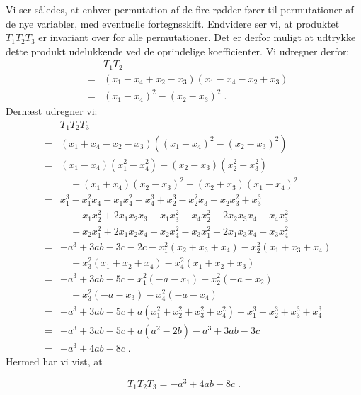 \documentclass[12pt,oneside,a4paper]{article}
\newcommand{\bas}{\begin{eqnarray*}}
\newcommand{\eas}{\end{eqnarray*}}
\begin{document}
Vi ser således, at enhver permutation af de fire rødder fører til permutationer
af de nye variabler, med eventuelle fortegnsskift. Endvidere ser vi, at
produktet $T_1 T_2 T_3$ er invariant over for alle permutationer. Det er derfor
muligt at udtrykke dette produkt udelukkende ved de oprindelige koefficienter.
Vi udregner derfor:
\bas
&& T_1 T_2 \\
&=& (x_1-x_4+x_2-x_3)(x_1-x_4-x_2+x_3) \\
&=& (x_1-x_4)^2 - (x_2-x_3)^2 \;.
\eas
Dernæst udregner vi:
\bas
&& T_1T_2T_3 \\
&=& (x_1+x_4-x_2-x_3)((x_1-x_4)^2 - (x_2-x_3)^2) \\
&=& (x_1-x_4)(x_1^2-x_4^2) + (x_2-x_3)(x_2^2-x_3^2) \\
&& \quad - (x_1+x_4)(x_2-x_3)^2 - (x_2+x_3)(x_1-x_4)^2 \\
&=& x_1^3 - x_1^2x_4 - x_1x_4^2 + x_4^3 + x_2^3 - x_2^2x_3 - x_2x_3^2 + x_3^3 \\
&& \quad - x_1x_2^2 + 2x_1x_2x_3 - x_1x_3^2 - x_4x_2^2 + 2x_2x_3x_4 - x_4x_3^2 \\
&& \quad - x_2x_1^2 + 2x_1x_2x_4 - x_2x_4^2 - x_3x_1^2 + 2x_1x_3x_4 - x_3x_4^2 \\
&=& -a^3 + 3ab - 3c - 2c - x_1^2(x_2+x_3+x_4) - x_2^2(x_1+x_3+x_4) \\
&& \quad - x_3^2(x_1+x_2+x_4) - x_4^2(x_1+x_2+x_3) \\
&=& -a^3 + 3ab - 5c - x_1^2(-a-x_1) - x_2^2(-a-x_2) \\
&& \quad - x_3^2(-a-x_3) - x_4^2(-a-x_4) \\
&=& -a^3 + 3ab - 5c + a(x_1^2+x_2^2+x_3^2+x_4^2) + x_1^3+x_2^3+x_3^3+x_4^3 \\
&=& -a^3 + 3ab - 5c + a(a^2-2b) - a^3 + 3ab - 3c \\
&=& -a^3 + 4ab - 8c \;.
\eas
Hermed har vi vist, at
\begin{tcolorbox}
\begin{equation}
T_1T_2T_3 = -a^3 + 4ab - 8c \;.
\label{t123}
\end{equation}
\end{tcolorbox}
\end{document}
